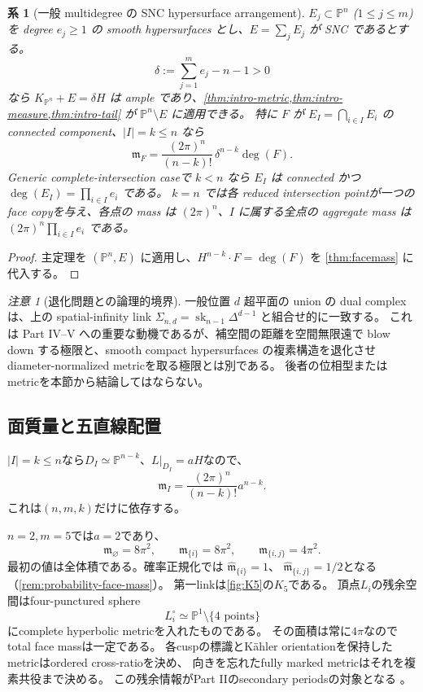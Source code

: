 \documentclass[11pt,a4paper]{ltjsarticle}
\newcommand{\PP}{\mathbb P}
\newcommand{\sk}{\operatorname{sk}}
\theoremstyle{plain}
\newtheorem{corollary}[corollary]{系}
\theoremstyle{definition}
\theoremstyle{remark}
\newtheorem{remark}[remark]{注意}
\begin{document}
\begin{corollary}[一般 multidegree の SNC hypersurface arrangement]
\label{cor:multidegree}
$E_j\subset\PP^n$ ($1\le j\le m$) を degree $e_j\ge1$ の smooth hypersurfaces とし、$E=\sum_jE_j$ が SNC であるとする。
\[
 \delta:=\sum_{j=1}^m e_j-n-1>0
\]
なら $K_{\PP^n}+E=\delta H$ は ample であり、\cref{thm:intro-metric,thm:intro-measure,thm:intro-tail} が $\PP^n\setminus E$ に適用できる。
特に $F$ が $E_I=\bigcap_{i\in I}E_i$ の connected component、$|I|=k\le n$ なら
\[
 \boxed{
 \mathfrak m_F=
 \frac{(2\pi)^n}{(n-k)!}\,\delta^{n-k}\deg(F).}
\]
Generic complete-intersection caseで $k<n$ なら $E_I$ は connected かつ $\deg(E_I)=\prod_{i\in I}e_i$ である。
$k=n$ では各 reduced intersection pointが一つの face copyを与え、各点の mass は $(2\pi)^n$、$I$ に属する全点の aggregate mass は $(2\pi)^n\prod_{i\in I}e_i$ である。
\end{corollary}
\begin{proof}
主定理を $(\PP^n,E)$ に適用し、$H^{n-k}\cdot F=\deg(F)$ を \cref{thm:facemass} に代入する。
\end{proof}

\begin{remark}[退化問題との論理的境界]
一般位置 $d$ 超平面の union の dual complex は、上の spatial-infinity link
$\Sigma_{n,d}=\sk_{n-1}\Delta^{d-1}$ と組合せ的に一致する。
これは Part IV--V への重要な動機であるが、補空間の距離を空間無限遠で blow down する極限と、smooth compact hypersurfaces の複素構造を退化させ diameter-normalized metricを取る極限とは別である。
後者の位相型または metricを本節から結論してはならない。
\end{remark}

\subsection{面質量と五直線配置}
$|I|=k\le n$なら$D_I\simeq\PP^{n-k}$、$L|_{D_I}=aH$なので、
\begin{equation}
\label{eq:arr-mass}
 \boxed{
 \mathfrak m_I=
 \frac{(2\pi)^n}{(n-k)!}a^{n-k}.}
\end{equation}
これは$(n,m,k)$だけに依存する。

$n=2,m=5$では$a=2$であり、
\[
 \mathfrak m_\varnothing=8\pi^2,
 \qquad
 \mathfrak m_{\{i\}}=8\pi^2,
 \qquad
 \mathfrak m_{\{i,j\}}=4\pi^2.
\]
最初の値は全体積である。確率正規化では
$\widehat{\mathfrak m}_{\{i\}}=1$、
$\widehat{\mathfrak m}_{\{i,j\}}=1/2$となる
（\cref{rem:probability-face-mass}）。
第一linkは\cref{fig:K5}の$K_5$である。
頂点$L_i$の残余空間はfour-punctured sphere
\[
 L_i^\circ\simeq\PP^1\setminus\{4\text{ points}\}
\]
にcomplete hyperbolic metricを入れたものである。
その面積は常に$4\pi$なのでtotal face massは一定である。
各cuspの標識とK\"ahler orientationを保持したmetricはordered cross-ratioを決め、
向きを忘れたfully marked metricはそれを複素共役まで決める。
この残余情報がPart IIのsecondary periodsの対象となる
\cite[補題\texttt{lem:metric-conjugation}]{UedaII}。
\end{document}
